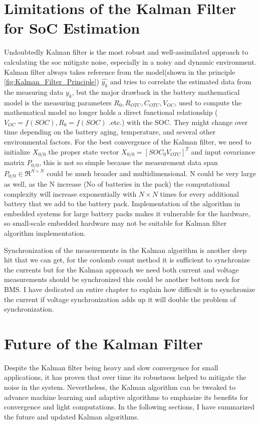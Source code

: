 \section{Limitations of the Kalman Filter for SoC Estimation }
Undoubtedly Kalman filter is the most robust and well-assimilated approach to calculating the soc mitigate noise, especially in a noisy and dynamic environment. Kalman filter always takes reference from the model(shown in the principle \ref{fig:Kalman_Filter_Principle}) $\hat{y_k}$ and tries to correlate the estimated data from the measuring data $y_k$, but the major drawback in the battery mathematical model is the measuring parameters $R_0,R_{OTC},C_{OTC},V_{OC}$, used to compute the mathematical model no longer holds a direct functional relationship ($V_{OC} = f(SOC) , R_{0} = f(SOC) $ .etc.) with the SOC. They might change over time depending on the battery aging, temperature, and several other environmental factors. For the best convergence of the Kalman filter, we need to initialize $X_{0/0}$ the proper state vector $X_{0/0} = [SOC_0 V_{OTC}]^T$ and input covariance matrix $P_{0/0}$, this is not so simple because the measurement data span $P_{0/0} \in \mathfrak{R}^{N \times N} $ could be much broader and multidimensional.
N could be very large as well, as the N increase (No of batteries in the pack) the computational complexity will increase exponentially with $N \times N$ times for every additional battery that we add to the battery pack.
Implementation of the algorithm in embedded systems for large battery packs makes it vulnerable for the hardware, so small-scale embedded hardware may not be suitable for Kalman filter algorithm implementation.


Synchronization of the measurements in the Kalman algorithm is another deep hit that we can get, for the coulomb count method it is sufficient to synchronize the currents but for the Kalman approach we need both current and voltage measurements should be synchronized this could be another bottom neck for BMS. I have dedicated an entire chapter to explain how difficult is to synchronize the current if voltage synchronization adds up it will double the problem of synchronization.

\section{Future of the Kalman Filter}
Despite the Kalman filter being heavy and slow convergence for small applications, it has proven that over time its robustness helped to mitigate the noise in the system. Nevertheless, the Kalman algorithm can be tweaked to advance machine learning and adaptive algorithms to emphasize its benefits for convergence and light computations. In the following sections, I have summarized the future and updated Kalman algorithms.
